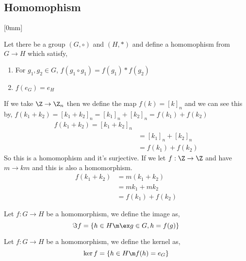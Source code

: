 
\subsection{Homomophism}[0mm]

\begin{ndefi}[Homomophism]
  Let there be a group $(G, \circ)$ and $(H, *)$ and define a homomophism from $G \to H$ which satisfy,
  \begin{enumerate}
    \item For $g_1, g_2 \in G$, $f(g_1 \circ g_1) = f(g_1) * f(g_2)$
    \item $f(e_G) = e_H$
  \end{enumerate}
\end{ndefi}

If we take $\Z \to \Z_n$ then we define the map $f(k) = [k]_n$ and we can see this by, $f(k_1 + k_2) = [k_1 + k_2]_n = [k_1]_n + [k_2]_n = f(k_1) + f(k_2)$
\begin{align*}
  f(k_1 + k_2) = [k_1 + k_2]_n\\
  &= [k_1]_n + [k_2]_n\\
  &= f(k_1) + f(k_2)
\end{align*}
So this is a homomophism and it's surjective. If we let $f: \Z \to \Z$ and have $m \to km$ and this is also a homomorphism.
\begin{align*}
  f(k_1 + k_2) &= m(k_1 + k_2)\\
  &= mk_1 + mk_2\\
  &= f(k_1) + f(k_2)
\end{align*}

\begin{ndefi}[Image]
  Let $f : G \to H$ be a homomorphism, we define the image as,
  $$ \Im f = \{ h \in H \m \ex g \in G, h = f(g)\} $$
\end{ndefi}

\begin{ndefi}[Kernel]
  Let $f : G \to H$ be a homomorphism, we define the kernel as,
  $$ \ker f = \{ h \in H \m f(h) = e_G \} $$
\end{ndefi}

